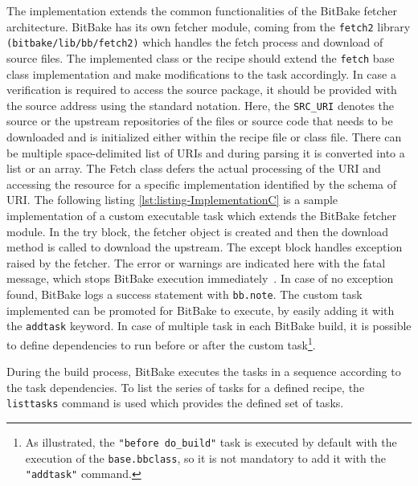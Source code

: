\noindent The implementation extends the common functionalities of the BitBake fetcher architecture. BitBake has its own fetcher module, coming from the \texttt{fetch2} library \texttt{(bitbake/lib/bb/fetch2)} which handles the fetch process and download of source files. The implemented class or the recipe should extend the \texttt{fetch} base class implementation and make modifications to the task accordingly. In case a verification is required to access the source package, it should be provided with the source address using the standard notation. Here, the \texttt{SRC\_URI} denotes the source or the upstream repositories of the files or source code that needs to be downloaded and is initialized either within the recipe file or class file. There can be multiple space-delimited list of URIs and during parsing it is converted into a list or an array. The Fetch class defers the actual processing of the URI and accessing the resource for a specific implementation identified by the schema of URI. The following listing \ref{lst:listing-ImplementationC} is a sample implementation of a custom executable task which extends the BitBake fetcher module. In the try block, the fetcher object is created and then the download method is called to download the upstream. The except block handles exception raised by the fetcher. The error or warnings are indicated here with the fatal message, which stops BitBake execution immediately~\parencite{Reference1}. In case of no exception found, BitBake logs a success statement with \texttt{bb.note}. The custom task implemented can be promoted for BitBake to execute, by easily adding it with the \texttt{addtask} keyword. In case of multiple task in each BitBake build, it is possible to define dependencies to run before or after the custom task\footnote{As illustrated, the \texttt{"before do\_build"} task is executed by default with the execution of the \texttt{base.bbclass}, so it is not mandatory to add it with the \texttt{"addtask"} command.}.


\vspace{0.5cm}
\lstset{style=mystyle}

\vspace{0.5cm}

During the build process, BitBake executes the tasks in a sequence according to the task dependencies. To list the series of tasks for a defined recipe, the \texttt{listtasks} command is used which provides the defined set of tasks. 


